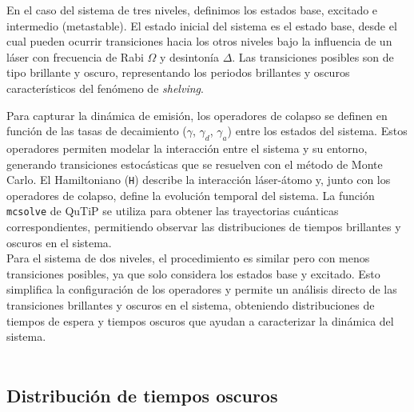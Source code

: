 \documentclass[12pt]{report}
\begin{document}
En el caso del sistema de tres niveles, definimos los estados base, excitado e intermedio (metastable). El estado inicial del sistema es el estado base, desde el cual pueden ocurrir transiciones hacia los otros niveles bajo la influencia de un láser con frecuencia de Rabi $\Omega$ y desintonía $\Delta$. Las transiciones posibles son de tipo brillante y oscuro, representando los periodos brillantes y oscuros característicos del fenómeno de \textit{shelving}.

Para capturar la dinámica de emisión, los operadores de colapso se definen en función de las tasas de decaimiento ($\gamma$, $\gamma_d$, $\gamma_a$) entre los estados del sistema. Estos operadores permiten modelar la interacción entre el sistema y su entorno, generando transiciones estocásticas que se resuelven con el método de Monte Carlo. El Hamiltoniano (\texttt{H}) describe la interacción láser-átomo y, junto con los operadores de colapso, define la evolución temporal del sistema. La función \texttt{mcsolve} de QuTiP se utiliza para obtener las trayectorias cuánticas correspondientes, permitiendo observar las distribuciones de tiempos brillantes y oscuros en el sistema.\\

Para el sistema de dos niveles, el procedimiento es similar pero con menos transiciones posibles, ya que solo considera los estados base y excitado. Esto simplifica la configuración de los operadores y permite un análisis directo de las transiciones brillantes y oscuros en el sistema, obteniendo distribuciones de tiempos de espera y tiempos oscuros que ayudan a caracterizar la dinámica del sistema.
\\
\\
\subsection*{Distribución de tiempos oscuros}\\
\end{document}
